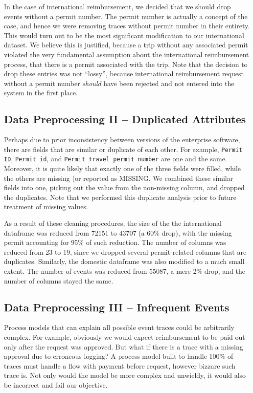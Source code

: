 \documentclass[conference]{IEEEtran}
\begin{document}
In the case of international reimbursement, we decided that we should
drop events without a permit number. The permit number is actually a
concept of the case, and hence we were removing traces without permit
number in their entirety. This would turn out to be the most significant
modification to our international dataset.
We believe this is justified, because a trip
without any associated permit violated the very fundamental assumption
about the international reimbursement process, that there is a permit
associated with the trip. Note that the decision to drop these entries was
not ``lossy'', because international reimbursement request without a permit
number \textit{should} have been rejected and not entered into the system
in the first place.

\subsection{Data Preprocessing II -- Duplicated Attributes}

Perhaps due to prior inconsistency between
versions of the enterprise software, there are fields that are similar
or duplicate of each other. For example, \texttt{Permit ID}, \texttt{Permit id},
and \texttt{Permit travel permit number} are one and the same.
Moreover, it is quite likely that exactly one of the three fields were
filled, while the others are missing (or reported as
\textsc{MISSING}. We combined these similar fields into one, picking out
the value from the non-missing column, and dropped the duplicates. Note that 
we performed this duplicate analysis prior to future treatment of missing
values.

As a result of these cleaning procedures, the size of the
the international dataframe was reduced from 72151 to 43707 (a 60\% drop),
with the
missing permit accounting for 95\% of such reduction. The number of
columns was reduced from 23 to 19, since we dropped
several permit-related columns that are duplicates.
Similarly, the domestic dataframe was also modified to a much small extent.
The number of events was reduced from 55087, a mere 2\% drop, and the
number of columns stayed the same.

\subsection{Data Preprocessing III -- Infrequent Events}

Process models that can explain all possible event traces could be
arbitrarily complex. For example, obviously we would expect reimbursement to
be paid out only after the request was approved. But what if there is
a trace with a missing approval due to erroneous logging? A process model
built to handle 100\% of traces must handle a flow with
payment before request, however bizzare such trace is.
Not only would the model be more complex and unwieldy,
it would also be incorrect and fail our objective.
\end{document}
